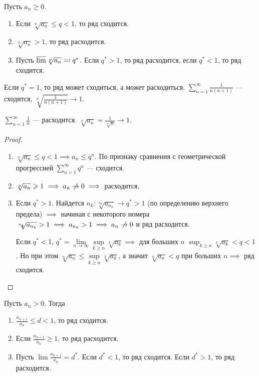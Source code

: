 \begin{theorem}
    Пусть $a_n \ge 0$.
    \begin{enumerate}
        \item Если $\sqrt[n]{a_n} \le q < 1$, то ряд сходится.
        \item $\sqrt[n]{a_n} > 1$, то ряд расходится.
        \item  Пусть $\varlimsup \sqrt[n]{a_n} \eqqcolon q^*$. Если  $q^* > 1$, то ряд расходится, если  $q^* < 1$, то ряд сходится.
    \end{enumerate}
\end{theorem}
\begin{remark}
    Если $q^* = 1$, то ряд может сходиться, а может расходиться.  $\sum\limits_{n=1}^\infty \frac{1}{n(n+1)}$ --- сходится, $\sqrt[n]{\frac{1}{n(n+1)}} \to 1$.

    $\sum\limits_{n=1}^\infty \frac{1}{n}$ --- расходится. $\sqrt[n]{a_n} = \frac{1}{\sqrt[n]{n}} \to 1$.
\end{remark}
\begin{proof}
    \begin{enumerate}
        \item $\sqrt[n]{a_n} \le q < 1 \implies a_n \le q^n$. По признаку сравнения с геометрической прогрессией $\sum\limits_{n=1}^\infty q^n$ --- сходится.
        \item  $\sqrt[n]{a_n} \ge 1 \implies a_n \centernot \to 0 \implies $ расходится.
        \item Если $q^* > 1$. Найдется  $n_k\!: \sqrt[n_k]{a_{n_k}} \to q^*  > 1$ (по определению верхнего предела)  $\implies$ начиная с некоторого номера $\sqrt[n_k]{a_{n_k}} > 1 \implies a_{n_k} > 1 \implies a_n \centernot \to 0$ и ряд расходится.

            Если $q^* < 1$,  $q^* = \lim\limits_{n \to \infty} \sup\limits_{k \ge n} \sqrt[k]{a_k} \implies$ для больших $n$  $\sup_{k \ge n} \sqrt[k]{a_k} < q < 1$. Но при этом $\sqrt[n]{a_n} \le \sup\limits_{k \ge n}\sqrt[k]{a_k}$, а значит $\sqrt[n]{a_n} < q$ при больших  $n \implies$ ряд сходится.
    \end{enumerate}
\end{proof}
\begin{theorem}
    Пусть $a_n > 0$. Тогда
     \begin{enumerate}
         \item $\frac{a_{n+1}}{a_n} \le d < 1$, то ряд сходится.
         \item Если  $\frac{a_{n+1}}{a_n} \ge 1$, то ряд расходится.
         \item Пусть  $\lim \frac{a_{n+1}}{a_n} = d^*$. Если $d^* < 1$, то ряд сходится. Если  $d^* > 1$, то ряд расходится.
    \end{enumerate}
\end{theorem}
